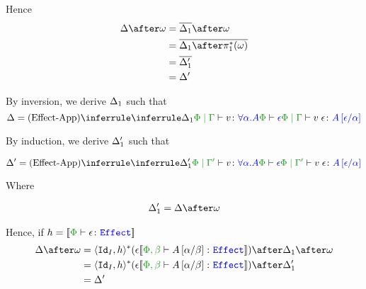 {    Hence \begin{align}
        \D\after\w & = \bar{\D_1}\after\w\\
        & = \bar{\D_1\after\pstar(\w)}\\
        & = \bar{\D_1'}\\
        & = \D'
    \end{align}
    
    By inversion, we derive $\Delta_1$ such that
    \begin{equation}
        \D = \ntreeruleII{Effect-App}{\treeruleI{\D_1}{\etyperelation{\P}{\G}{v}{\all{\a}{A}}}}{\wellformed{\P}{\e}}{\etyperelation{\P}{\G}{\eapp{v}{\e}}{A\ssub{\a}{\e}}}
    \end{equation}
    
    By induction, we derive $\Delta_1'$ such that
    
    \begin{equation}
        \D' = \ntreeruleII{Effect-App}{\treeruleI{\D_1'}{\etyperelation{\P}{\G'}{v}{\all{\a}{A}}}}{\wellformed{\P}{\e}}{\etyperelation{\P}{\G'}{\eapp{v}{\e}}{A\ssub{\a}{\e}}}
    \end{equation}
    
    Where 
    
    \begin{align}
        \D_1' = \D\after\w
    \end{align}
    
    
    
    Hence, if $h = \deno{\typerelation{\P}{\e}{\effect}}$
    \begin{align}
        \D\after\w &= \pr{\Id{I}}{h}\star(\e{\deno{\typerelation{\P,\b}{A\ssub{\b}{\a}}{\effect}}})\after\D_1\after\w\\
        &= \pr{\Id{I}}{h}\star(\e{\deno{\typerelation{\P,\b}{A\ssub{\b}{\a}}{\effect}}})\after\D_1'\\
        & = \D'
    \end{align}
}
